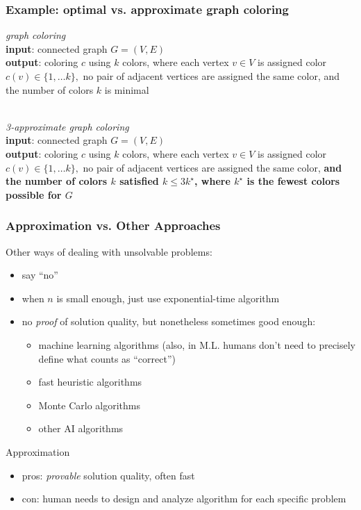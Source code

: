 \documentclass{beamer}
\newcommand{\stanza}{ \\~\ }
\begin{document}
\begin{frame} \frametitle{Example: optimal vs. approximate graph coloring}
\emph{graph coloring} \\
\textbf{input}: connected graph $G=(V,E)$ \\
\textbf{output}: coloring $c$ using $k$ colors, where each vertex $v \in V$ is assigned color
  $c(v) \in \{1, \ldots k\},$ no pair of adjacent vertices are assigned the
  same color, and the number of colors $k$ is minimal
\stanza

\emph{3-approximate graph coloring} \\
\textbf{input}: connected graph $G=(V,E)$ \\
\textbf{output}: coloring $c$ using $k$ colors, where each vertex $v \in V$ is assigned color
  $c(v) \in \{1, \ldots k\},$ no pair of adjacent vertices are assigned the
  same color, \textbf{and the number of colors $k$ satisfied $k \leq 3 k^\star$,
  where $k^\star$ is the fewest colors possible for $G$}
\end{frame}

\begin{frame} \frametitle{Approximation vs. Other Approaches}
Other ways of dealing with unsolvable problems:
\begin{itemize}
  \item say ``no''
  \item when $n$ is small enough, just use exponential-time algorithm
  \item no \emph{proof} of solution quality, but nonetheless sometimes good enough:
    \begin{itemize}
      \item machine learning algorithms (also, in M.L. humans don't need to precisely define what counts as ``correct'')
      \item fast heuristic algorithms
      \item Monte Carlo algorithms
      \item other AI algorithms
    \end{itemize}
\end{itemize}

Approximation
\begin{itemize}
  \item pros: \emph{provable} solution quality, often fast
  \item con: human needs to design and analyze algorithm for each specific problem
\end{itemize}
\end{frame}
\end{document}
